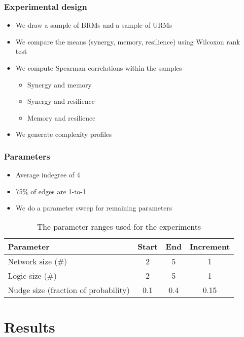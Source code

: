 \documentclass[hyperref={pdfpagelabels=false}]{beamer}
\begin{document}
\begin{frame}
\frametitle{Experimental design}
\begin{itemize}
\item We draw a sample of BRMs and a sample of URMs
\item We compare the means (synergy, memory, resilience) using Wilcoxon rank test
\item We compute Spearman correlations within the samples
\begin{itemize}
\item Synergy and memory
\item Synergy and resilience
\item Memory and resilience
\end{itemize}
\item We generate complexity profiles
\end{itemize}
\end{frame}

\begin{frame}
\frametitle{Parameters}
\begin{itemize}
\item Average indegree of 4 \cite{lahdesmaki2003learning}
\item 75\% of edges are 1-to-1 
\item We do a parameter sweep for remaining parameters
\end{itemize}
\begin{table}[H]
\begin{tabular}{| l | c | c | c |}
\hline
Parameter & Start & End & Increment \\
\hline
Network size (\#) & 2 & 5 & 1 \\
Logic size (\#) & 2 & 5 & 1 \\
Nudge size (fraction of probability) & 0.1 & 0.4 & 0.15 \\
\hline
\end{tabular}
\centering
\caption{The parameter ranges used for the experiments}
\label{parameters}
\end{table}
\end{frame}

\section{Results}
\setcounter{subsection}{1}
\end{document}
